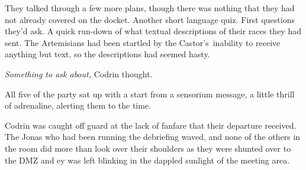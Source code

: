 They talked through a few more plans, though there was nothing that they had not already covered on the docket. Another short language quiz. First questions they'd ask. A quick run-down of what textual descriptions of their races they had sent. The Artemisians had been startled by the Castor's\pagebreak~inability to receive anything but text, so the descriptions had seemed hasty.

\emph{Something to ask about,} Codrin thought.

All five of the party sat up with a start from a sensorium message, a little thrill of adrenaline, alerting them to the time.

Codrin was caught off guard at the lack of fanfare that their departure received. The Jonas who had been running the debriefing waved, and none of the others in the room did more than look over their shoulders as they were shunted over to the DMZ and ey was left blinking in the dappled sunlight of the meeting area.
